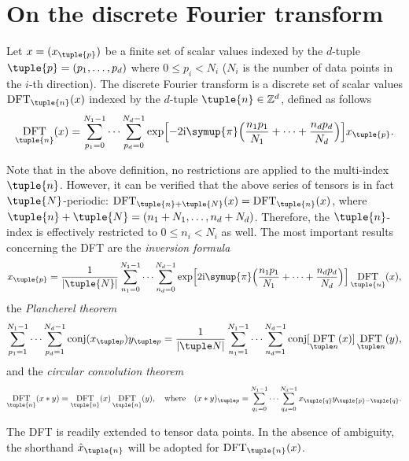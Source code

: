 \documentclass[draft, appendixprefix=true, chapterprefix=true, fontsize=12pt, numbers=noendperiod]{scrbook}
\DeclareMathOperator{\conj}{conj}
\DeclareMathOperator{\dft}{DFT}
\newcommand{\I}{\mathrm{i}}
\newcommand{\integers}{\mathbb{Z}}
\newcommand{\PI}{\symup{\pi}}
\begin{document}
\section{On the discrete Fourier transform}

Let \(x=(x_{\tuple{p}})\) be a finite set of scalar values indexed by the
\(d\)-tuple \(\tuple{p}=(p_1, \ldots, p_d)\) where \(0\leq p_i<N_i\) (\(N_i\)
is the number of data points in the \(i\)-th direction). The discrete Fourier
transform is a discrete set of scalar values \(\dft_{\tuple{n}}(x)\)
indexed by the \(d\)-tuple \(\tuple{n}\in\integers^d\), defined as follows
\begin{equation}
  \dft_{\tuple{n}}(x)=\sum_{p_1=0}^{N_1-1}\cdots\sum_{p_d=0}^{N_d-1}\exp
  \Bigl[-2\I\PI\Bigl(\frac{n_1p_1}{N_1}+\cdots+\frac{n_dp_d}{N_d}\Bigr)\Bigr]
  x_{\tuple{p}}.
\end{equation}

Note that in the above definition, no restrictions are applied to the
multi-index \(\tuple{n}\). However, it can be verified that the above series of
tensors is in fact \(\tuple{N}\)-periodic:
\(\dft_{\tuple{n}+\tuple{N}}(x)=\dft_{\tuple{n}}(x)\), where
\(\tuple{n}+\tuple{N}=(n_1+N_1, \ldots, n_d+N_d)\). Therefore, the
\(\tuple{n}\)-index is effectively restricted to \(0\leq n_i<N_i\) as well. The
most important results concerning the DFT are the \emph{inversion formula}
\begin{equation}
  x_{\tuple{p}}=\frac1{\lvert\tuple{N}\rvert}\sum_{n_1=0}^{N_1-1}\cdots
  \sum_{n_d=0}^{N_d-1}\exp\Bigl[2\I\PI\Bigl(\frac{n_1p_1}{N_1}+\cdots+
  \frac{n_dp_d}{N_d}\Bigr)\Bigr]\dft_{\tuple{n}}(x),
\end{equation}
the \emph{Plancherel theorem}
\begin{equation}
  \label{eq:20203128093105}
  \sum_{p_1=1}^{N_1-1}\cdots\sum_{p_d=1}^{N_d-1}\conj(x_{\tuple p})y_{\tuple p}
  =\frac1{\lvert\tuple N\rvert}\sum_{n_1=1}^{N_1-1}\cdots\sum_{n_d=1}^{N_d-1}
  \conj[\dft_{\tuple n}(x)]\dft_{\tuple n}(y),
\end{equation}
and the \emph{circular convolution theorem}
\begin{equation}
  \dft_{\tuple{n}}(x\ast y)=\dft_{\tuple{n}}(x)\dft_{\tuple{n}}(y),
  \quad\text{where}\quad
  (x\ast y)_{\tuple p}=\sum_{q_1=0}^{N_1-1}\cdots\sum_{q_d=0}^{N_d-1}
  x_{\tuple{q}}y_{\tuple{p}-\tuple{q}}.
\end{equation}

The DFT is readily extended to tensor data points. In the absence of ambiguity,
the shorthand \(\hat{x}_{\tuple{n}}\) will be adopted for
\(\dft_{\tuple{n}}(x)\).
\end{document}
